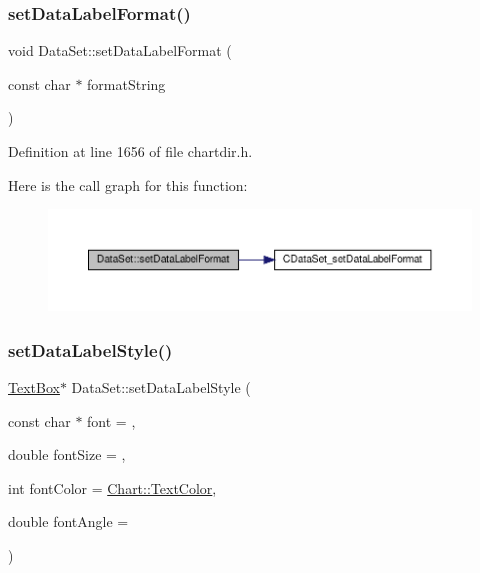 \subsubsection{\texorpdfstring{set\+Data\+Label\+Format()}{setDataLabelFormat()}}
{\footnotesize\ttfamily void Data\+Set\+::set\+Data\+Label\+Format (\begin{DoxyParamCaption}\item[{const char $\ast$}]{format\+String }\end{DoxyParamCaption})\hspace{0.3cm}{\ttfamily [inline]}}



Definition at line 1656 of file chartdir.\+h.

Here is the call graph for this function\+:
\nopagebreak
\begin{figure}[H]
\begin{center}
\leavevmode
\includegraphics[width=350pt]{class_data_set_a009504918f4973a74b36cb80ee219644_cgraph}
\end{center}
\end{figure}
\mbox{\label{class_data_set_afecb7de8fdcaaa31e46e7ae6181a18f8}} 
\subsubsection{\texorpdfstring{set\+Data\+Label\+Style()}{setDataLabelStyle()}}
{\footnotesize\ttfamily \hyperlink{class_text_box}{Text\+Box}$\ast$ Data\+Set\+::set\+Data\+Label\+Style (\begin{DoxyParamCaption}\item[{const char $\ast$}]{font = {},  }\item[{double}]{font\+Size = {},  }\item[{int}]{font\+Color = {\ttfamily \hyperlink{namespace_chart_abee0d882fdc9ad0b001245ad9fc64011a879e14f2f5024caccc047374342321ef}{Chart\+::\+Text\+Color}},  }\item[{double}]{font\+Angle = {} }\end{DoxyParamCaption})\hspace{0.3cm}{\ttfamily [inline]}}



